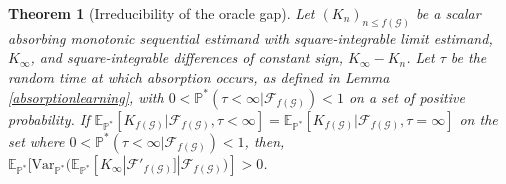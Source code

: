 \documentclass{article}
\newcommand{\Var}{\mathrm{Var}_{\mathbb{P}^*} }
\newtheorem{theorem}{Theorem}
\begin{document}
\begin{theorem}[Irreducibility of the oracle gap]
\label{irreduciblegap}
Let $(K_n)_{n\leq f(\mathcal{G})}$ be a scalar absorbing monotonic sequential estimand with square-integrable limit estimand, $K_\infty$, and square-integrable differences of constant sign, $K_\infty-K_n$. Let $\tau$ be the random time at which absorption occurs, as defined in Lemma \ref{absorptionlearning}, with $0<\mathbb{P}^*(\tau<\infty|\mathcal{F}_{f(\mathcal{G})})<1$ on a set of positive probability. If $\mathbb{E}_{\mathbb{P}^*}[K_{f(\mathcal{G})}|\mathcal{F}_{f(\mathcal{G})}, \tau<\infty]=\mathbb{E}_{\mathbb{P}^*}[K_{f(\mathcal{G})}|\mathcal{F}_{f(\mathcal{G})}, \tau=\infty]$ on the set where $0<\mathbb{P}^*(\tau<\infty|\mathcal{F}_{f(\mathcal{G})})<1$, then, $\mathbb{E}_{\mathbb{P}^*}[\Var(\mathbb{E}_{\mathbb{P}^*}[K_\infty|\mathcal{F}'_{f(\mathcal{G})}]|\mathcal{F}_{f(\mathcal{G})})] > 0$.
\end{theorem}
\end{document}
